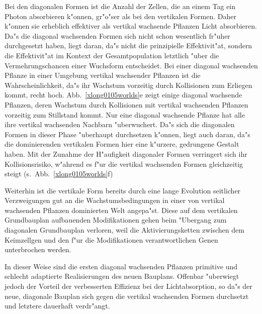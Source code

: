 Bei den diagonalen
Formen ist die Anzahl der Zellen, die an einem Tag ein Photon absorbieren k"onnen, gr"o"ser
als bei den vertikalen Formen. Daher k"onnen sie erheblich effektiver als vertikal wachsende Pflanzen
Licht absorbieren. Da"s die diagonal wachsenden Formen sich nicht schon wesentlich fr"uher
durchgesetzt haben, liegt daran, da"s nicht die prinzipielle Effektivit"at, sondern die
Effektivit"at im Kontext der Gesamtpopulation letztlich "uber die Vermehrungschancen einer
Wuchsform entscheidet. Bei einer diagonal wachsenden
Pflanze in einer Umgebung vertikal wachsender Pflanzen ist die Wahrscheinlichkeit, da"s ihr Wachstum
vorzeitig durch Kollisionen zum Erliegen kommt, recht hoch. Abb.\ \ref{xlong0105worlds}e zeigt
einige diagonal wachsende Pflanzen, deren Wachstum durch Kollisionen mit vertikal wachsenden
Pflanzen vorzeitig zum Stillstand kommt. Nur eine diagonal wachsende Pflanze hat alle ihre
vertikal wachsenden Nachbarn "uberwuchert. Da"s sich die diagonalen Formen in dieser Phase "uberhaupt
durchsetzen k"onnen, liegt auch daran, da"s die dominierenden vertikalen Formen hier eine k"urzere,
gedrungene Gestalt haben. Mit der Zunahme der H"aufigkeit
diagonaler Formen verringert sich ihr Kollisionsrisiko, w"ahrend es f"ur die vertikal wachsenden
Formen gleichzeitig steigt (s.\ Abb.\ \ref{xlong0105worlds}f)


Weiterhin ist die vertikale Form bereits durch eine lange Evolution
seitlicher Verzweigungen gut an die Wachstumsbedingungen in einer von vertikal wachsenden Pflanzen
dominierten Welt angepa"st. Diese auf dem vertikalen Grundbauplan aufbauenden Modifikationen
gehen beim "Ubergang zum diagonalen Grundbauplan verloren, weil die Aktivierungsketten
zwischen dem Keimzellgen und den f"ur die Modifikationen verantwortlichen Genen unterbrochen 
werden.

In dieser Weise sind die ersten diagonal wachsenden Pflanzen primitive und schlecht adaptierte
Realisierungen des neuen Bauplans. Offenbar "uberwiegt jedoch der Vorteil der verbesserten
Effizienz bei der Lichtabsorption, so da"s der neue, diagonale Bauplan sich gegen die vertikal
wachsenden Formen durchsetzt und letztere dauerhaft verdr"angt.


